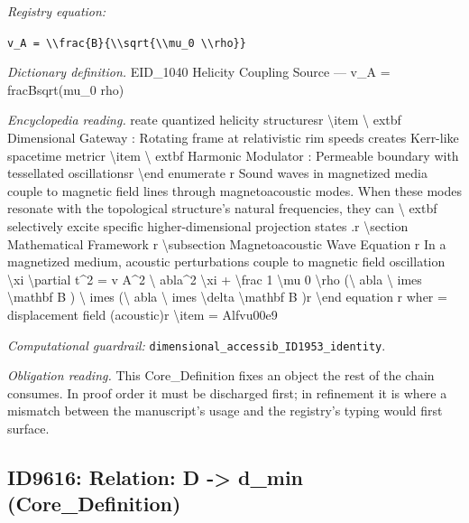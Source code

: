 \documentclass[11pt]{article}
\theoremstyle{remark}
\begin{document}
\noindent\textit{Registry equation:}\par
{\small\texttt{v\_A = \textbackslash{}\textbackslash{}frac\{B\}\{\textbackslash{}\textbackslash{}sqrt\{\textbackslash{}\textbackslash{}mu\_0 \textbackslash{}\textbackslash{}rho\}\}}}\par\medskip
\noindent\textit{Dictionary definition.} EID\_1040 Helicity Coupling Source --- v\_A = fracBsqrt(mu\_0 rho)\par\medskip
\noindent\textit{Encyclopedia reading.} reate quantized helicity structuresr \textbackslash{}item \textbackslash{} extbf Dimensional Gateway : Rotating frame at relativistic rim speeds creates Kerr-like spacetime metricr \textbackslash{}item \textbackslash{} extbf Harmonic Modulator : Permeable boundary with tessellated oscillationsr \textbackslash{}end enumerate r Sound waves in magnetized media couple to magnetic field lines through magnetoacoustic modes. When these modes resonate with the topological structure's natural frequencies, they can \textbackslash{} extbf selectively excite specific higher-dimensional projection states .r \textbackslash{}section Mathematical Framework r \textbackslash{}subsection Magnetoacoustic Wave Equation r In a magnetized medium, acoustic perturbations couple to magnetic field oscillation \textbackslash{}xi \textbackslash{}partial t\textasciicircum{}2 = v A\textasciicircum{}2 \textbackslash{} abla\textasciicircum{}2 \textbackslash{}xi + \textbackslash{}frac 1 \textbackslash{}mu 0 \textbackslash{}rho (\textbackslash{} abla \textbackslash{} imes \textbackslash{}mathbf B ) \textbackslash{} imes (\textbackslash{} abla \textbackslash{} imes \textbackslash{}delta \textbackslash{}mathbf B )r \textbackslash{}end equation r wher = displacement field (acoustic)r \textbackslash{}item = Alfvu00e9
\par\medskip\noindent\textit{Computational guardrail:} \texttt{dimensional\_accessib\_ID1953\_identity}.
\par\medskip\noindent\textit{Obligation reading.} This Core\_Definition fixes an object the rest of the chain consumes. In proof order it must be discharged first; in refinement it is where a mismatch between the manuscript's usage and the registry's typing would first surface.

\subsection{ID9616: Relation: D -> d\_min (Core\_Definition)}
\end{document}

